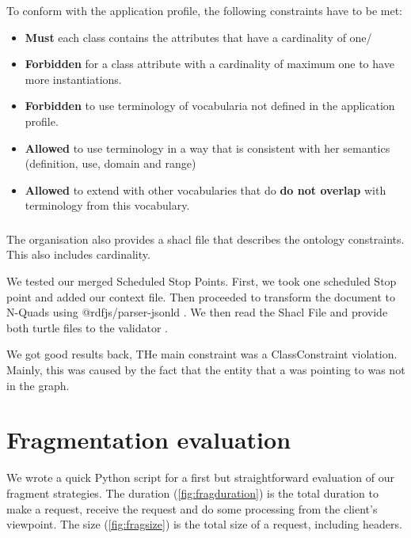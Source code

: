 To conform with the  application profile, the following constraints have to be met:
\begin{itemize}
    \item \textbf{Must} each class contains the attributes that have a cardinality of one/
    \item \textbf{Forbidden} for a class attribute with a cardinality of maximum one to have more instantiations.
    \item \textbf{Forbidden} to use terminology of vocabularia not defined in the application profile.
    \item \textbf{Allowed} to use terminology in a way that is consistent with her semantics (definition, use, domain and range)
    \item \textbf{Allowed} to extend with other vocabularies that do \textbf{do not overlap} with terminology from this vocabulary. 
\end{itemize}
\subsubsection{}

The  organisation also provides a shacl file that describes the ontology constraints. This also includes cardinality.

We tested our merged Scheduled Stop Points. First, we took one scheduled Stop point and added our context file. Then proceeded to transform the  document to N-Quads using @rdfjs/parser-jsonld \cite{noauthor_rdfjs-baseparser-jsonld_2024}. We then read the Shacl File and provide both turtle files to the  validator \cite{noauthor_rdf-validate-shacl_2024}.

We got good results back, THe main constraint was a ClassConstraint violation. Mainly, this was caused by the fact that the entity that a  was pointing to was not in the graph.

\section{Fragmentation evaluation}
We wrote a quick Python script for a first but straightforward evaluation of our fragment strategies. The duration (\autoref{fig:fragduration}) is the total duration to make a request, receive the request and do some processing from the client's viewpoint. The size (\autoref{fig:fragsize}) is the total size of a request, including headers.


